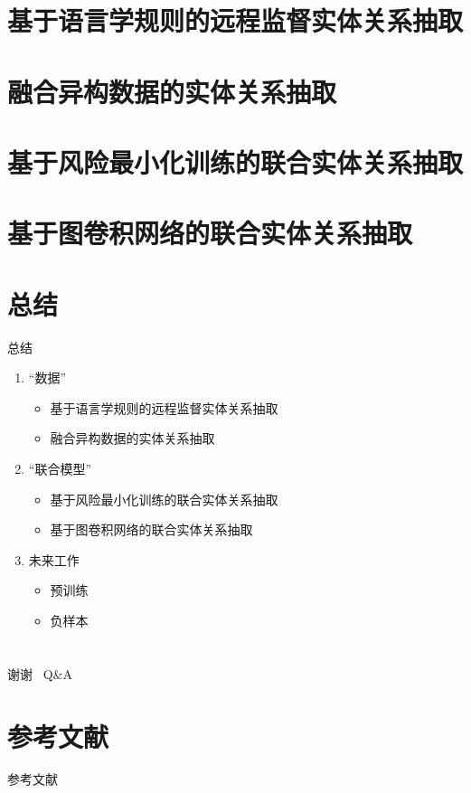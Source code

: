 \documentclass{beamer}
\begin{document}
\section{基于语言学规则的远程监督实体关系抽取}

\section{融合异构数据的实体关系抽取}

\section{基于风险最小化训练的联合实体关系抽取}

\section{基于图卷积网络的联合实体关系抽取}

\section{总结}

\begin{frame}{总结}
    \begin{enumerate}
        \item “数据”
            \begin{itemize}
                \item 基于语言学规则的远程监督实体关系抽取
                \item 融合异构数据的实体关系抽取
            \end{itemize}
        \item “联合模型”
            \begin{itemize}
                \item 基于风险最小化训练的联合实体关系抽取
                \item 基于图卷积网络的联合实体关系抽取
            \end{itemize}
        \item 未来工作
            \begin{itemize}
                \item 预训练
                \item 负样本
            \end{itemize}
    \end{enumerate}
\end{frame}

\section*{}
\begin{frame}
    \Huge{谢谢~ Q\&A}
\end{frame}

\section*{参考文献}

\begin{frame}[allowframebreaks]{参考文献}

\end{frame}

\end{document}
